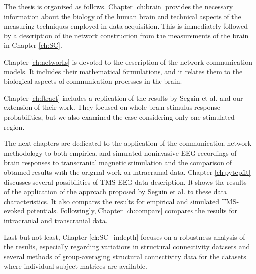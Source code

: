 The thesis is organized as follows. Chapter \ref{ch:brain} provides the necessary information about the biology of the human brain and technical aspects of the measuring techniques employed in data acquisition. This is immediately followed by a description of the network construction from the measurements of the brain in Chapter \ref{ch:SC}.

Chapter \ref{ch:networks} is devoted to the description of the network communication models. It includes their mathematical formulations, and it relates them to the biological aspects of communication processes in the brain.

Chapter \ref{ch:ftract} includes a replication of the results by Seguin et al. and our extension of their work. They focused on whole-brain stimulus-response probabilities, but we also examined the case considering only one stimulated region. 

The next chapters are dedicated to the application of the communication network methodology to both empirical and simulated noninvasive EEG recordings of brain responses to transcranial magnetic stimulation and the comparison of obtained results with the original work on intracranial data. Chapter \ref{ch:pytepfit} discusses several possibilities of TMS-EEG data description. It shows the results of the application of the approach proposed by Seguin et al. to these data characteristics. It also compares the results for empirical and simulated TMS-evoked potentials. Followingly, Chapter \ref{ch:compare} compares the results for intracranial and transcranial data.

Last but not least, Chapter \ref{ch:SC_indepth} focuses on a robustness analysis of the results, especially regarding variations in structural connectivity datasets and several methods of group-averaging structural connectivity data for the datasets where individual subject matrices are available.


